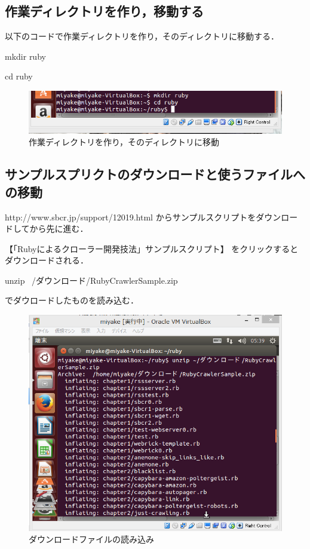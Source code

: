 \subsection{作業ディレクトリを作り，移動する}

以下のコードで作業ディレクトリを作り，そのディレクトリに移動する．

mkdir ruby



cd ruby


\begin{figure}[H]
\centering
\includegraphics[width=15cm]{idou.PNG}
\caption{作業ディレクトリを作り，そのディレクトリに移動}\label{サンプル図}
\end{figure}

\subsection{サンプルスプリクトのダウンロードと使うファイルへの移動}
http://www.sbcr.jp/support/12019.html 
からサンプルスクリプトをダウンロードしてから先に進む．

【「Rubyによるクローラー開発技法」サンプルスクリプト】
をクリックするとダウンロードされる．

unzip ~/ダウンロード/RubyCrawlerSample.zip

でダウロードしたものを読み込む．

\begin{figure}[H]
\centering
\includegraphics[width=15cm]{download.PNG}
\caption{ダウンロードファイルの読み込み}\label{サンプル図}
\end{figure}

